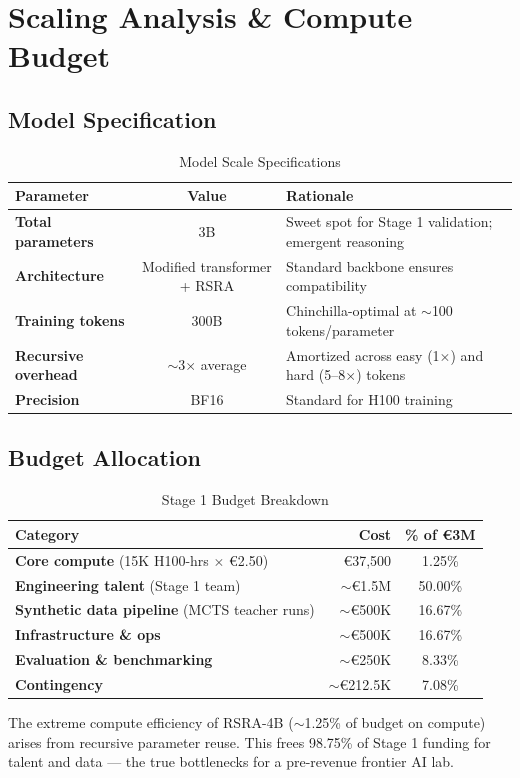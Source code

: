 \documentclass[11pt,a4paper]{article}
\theoremstyle{definition}
\begin{document}
\section{Scaling Analysis \& Compute Budget}

\subsection{Model Specification}
\begin{table}[h]
\centering
\caption{Model Scale Specifications}
\begin{tabular}{lcl}
\toprule
Parameter & Value & Rationale \\
\midrule
\textbf{Total parameters} & 3B & Sweet spot for Stage 1 validation; emergent reasoning \\
\textbf{Architecture} & Modified transformer + RSRA & Standard backbone ensures compatibility \\
\textbf{Training tokens} & 300B & Chinchilla-optimal at $\sim$100 tokens/parameter \\
\textbf{Recursive overhead} & $\sim$3$\times$ average & Amortized across easy (1$\times$) and hard (5--8$\times$) tokens \\
\textbf{Precision} & BF16 & Standard for H100 training \\
\bottomrule
\end{tabular}
\end{table}

\subsection{Budget Allocation}
\begin{table}[h]
\centering
\caption{Stage 1 Budget Breakdown}
\begin{tabular}{lrc}
\toprule
Category & Cost & \% of €3M \\
\midrule
\textbf{Core compute} (15K H100-hrs $\times$ €2.50) & €37,500 & 1.25\% \\
\textbf{Engineering talent} (Stage 1 team) & $\sim$€1.5M & 50.00\% \\
\textbf{Synthetic data pipeline} (MCTS teacher runs) & $\sim$€500K & 16.67\% \\
\textbf{Infrastructure \& ops} & $\sim$€500K & 16.67\% \\
\textbf{Evaluation \& benchmarking} & $\sim$€250K & 8.33\% \\
\textbf{Contingency} & $\sim$€212.5K & 7.08\% \\
\bottomrule
\end{tabular}
\end{table}
The extreme compute efficiency of RSRA-4B ($\sim$1.25\% of budget on compute) arises from recursive parameter reuse. This frees 98.75\% of Stage 1 funding for talent and data --- the true bottlenecks for a pre-revenue frontier AI lab.
\end{document}
